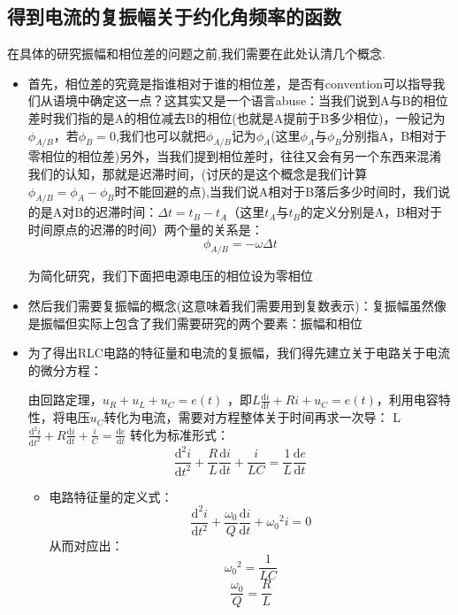 \documentclass[12pt]{book}
\theoremstyle{definition}\newtheorem{dfn}{Définition}[chapter]
\theoremstyle{plain}\newtheorem{thm}{Théorème}[chapter]
\theoremstyle{plain}\newtheorem{prp}{Proposition}[chapter]
\theoremstyle{plain}\newtheorem{lem}{\bf Lemme}[chapter]
\theoremstyle{plain}\newtheorem{axm}{\bf Axiome}[chapter]
\theoremstyle{plain}\newtheorem{lmm}{\bf Lemme}[chapter]
\theoremstyle{plain}\newtheorem{cor}{\bf Corollaire}[chapter]
\theoremstyle{remark}\newtheorem{rem}{Remarque}[chapter]
\begin{document}
\subsection{得到电流的复振幅关于约化角频率的函数}
在具体的研究振幅和相位差的问题之前,我们需要在此处认清几个概念.
\begin{itemize}

\item 首先，相位差的究竟是指谁相对于谁的相位差，是否有convention可以指导我们从语境中确定这一点？这其实又是一个语言abuse：当我们说到A与B的相位差时我们指的是A的相位减去B的相位(也就是A{\color{red}提前}于B多少相位)，一般记为$\phi_{A/B}$，若$\phi _{B}=0$,我们也可以就把$\phi_{A/B}$记为$\phi_{A}$(这里$\phi_{A}$与$\phi_{B}$分别指A，B相对于零相位的相位差)另外，当我们提到相位差时，往往又会有另一个东西来混淆我们的认知，那就是迟滞时间，(讨厌的是这个概念是我们计算$\phi_{A/B}=\phi_{A}-\phi_{B}$时不能回避的点),当我们说A相对于B{\color{red}落后}多少时间时，我们说的是A对B的迟滞时间：$\Delta t=t_B-t_A$（这里$t_A$与$t_B$的定义分别是A，B相对于时间原点的迟滞的时间）两个量的关系是：
$$
\phi_{A/B}=-\omega \Delta t
$$

为简化研究，我们下面把电源电压的相位设为零相位
\item 然后我们需要复振幅的概念(这意味着我们需要用到复数表示)：复振幅虽然像是振幅但实际上包含了我们需要研究的两个要素：振幅和相位

\item 为了得出RLC电路的特征量和电流的复振幅，我们得先建立关于电路关于电流的微分方程：

由回路定理，$u_R+u_L+u_C=e(t)$
，即$L\frac{\mathrm{d} i}{\mathrm{d} t} + Ri + u_C = e(t)$，利用电容特性，将电压$u_C$转化为电流，需要对方程整体关于时间再求一次导：
L$\frac{\mathrm{d^2} i}{\mathrm{d} t^2} + R\frac{\mathrm{d} i}{\mathrm{d} t}+\frac{i}{C}=\frac{\mathrm{d} e}{\mathrm{d} t}$
转化为标准形式：
$$
\frac{\mathrm{d^2} i}{\mathrm{d} t^2} + \frac{R}{L}\frac{\mathrm{d} i}{\mathrm{d} t}+\frac{i}{LC}=\frac{1}{L}\frac{\mathrm{d} e}{\mathrm{d} t}
$$
\begin{itemize}
	
\item 电路特征量的定义式：
$$
\frac{\mathrm{d^2} i}{\mathrm{d} t^2} + \frac{\omega_0}{Q}\frac{\mathrm{d} i}{\mathrm{d} t}+{\omega_0}^2 i=0
$$
从而对应出：
$$
{\omega_0}^2=\frac{1}{LC}
$$
$$
\frac{\omega_0}{Q}=\frac{R}{L}
$$


\end{itemize}
\end{itemize}
\end{document}
